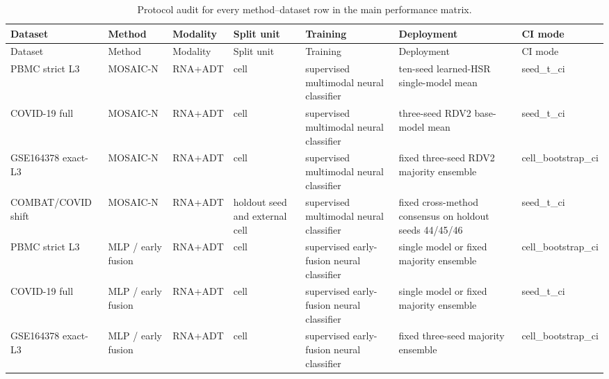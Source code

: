 \begingroup
\scriptsize
\setlength{\tabcolsep}{3pt}
\begin{longtable}{>{\raggedright\arraybackslash}p{}>{\raggedright\arraybackslash}p{}>{\raggedright\arraybackslash}p{}>{\raggedright\arraybackslash}p{}>{\raggedright\arraybackslash}p{}>{\raggedright\arraybackslash}p{}>{\raggedright\arraybackslash}p{}}
\caption{Protocol audit for every method--dataset row in the main performance matrix.}\label{tab:baseline-protocols}\\
\toprule
Dataset & Method & Modality & Split unit & Training & Deployment & CI mode \\
\midrule
\endfirsthead
\toprule
Dataset & Method & Modality & Split unit & Training & Deployment & CI mode \\
\midrule
\endhead
PBMC strict L3 & MOSAIC-N & RNA+\allowbreak{}ADT & cell & supervised multimodal neural classifier & ten-seed learned-HSR single-model mean & seed\_\allowbreak{}t\_\allowbreak{}ci \\
COVID-19 full & MOSAIC-N & RNA+\allowbreak{}ADT & cell & supervised multimodal neural classifier & three-seed RDV2 base-model mean & seed\_\allowbreak{}t\_\allowbreak{}ci \\
GSE164378 exact-L3 & MOSAIC-N & RNA+\allowbreak{}ADT & cell & supervised multimodal neural classifier & fixed three-seed RDV2 majority ensemble & cell\_\allowbreak{}bootstrap\_\allowbreak{}ci \\
COMBAT/\allowbreak{}COVID shift & MOSAIC-N & RNA+\allowbreak{}ADT & holdout seed and external cell & supervised multimodal neural classifier & fixed cross-method consensus on holdout seeds 44/\allowbreak{}45/\allowbreak{}46 & seed\_\allowbreak{}t\_\allowbreak{}ci \\
PBMC strict L3 & MLP /\allowbreak{} early fusion & RNA+\allowbreak{}ADT & cell & supervised early-fusion neural classifier & single model or fixed majority ensemble & cell\_\allowbreak{}bootstrap\_\allowbreak{}ci \\
COVID-19 full & MLP /\allowbreak{} early fusion & RNA+\allowbreak{}ADT & cell & supervised early-fusion neural classifier & single model or fixed majority ensemble & seed\_\allowbreak{}t\_\allowbreak{}ci \\
GSE164378 exact-L3 & MLP /\allowbreak{} early fusion & RNA+\allowbreak{}ADT & cell & supervised early-fusion neural classifier & fixed three-seed majority ensemble & cell\_\allowbreak{}bootstrap\_\allowbreak{}ci \\

\end{longtable}
